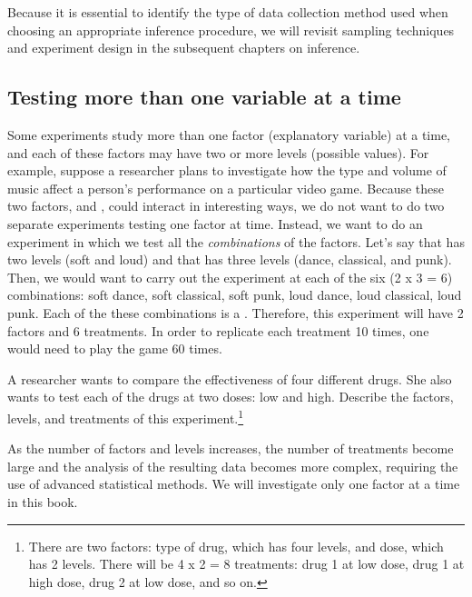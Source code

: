 Because it is essential to identify the type of data collection method used when choosing an appropriate inference procedure, we will revisit sampling techniques and experiment design in the subsequent chapters on inference.



\subsection{Testing more than one variable at a time}


Some experiments study more than one factor (explanatory variable) at a time, and each of these factors may have two or more levels (possible values). For example, suppose a researcher plans to investigate how the type and volume of music affect a person's performance on a particular video game. Because these two factors,  and , could interact in interesting ways, we do not want to do two separate experiments testing one factor at time. %
Instead, we want to do an experiment in which
we test all the \emph{combinations} of the factors. Let's say that  has two levels (soft and loud) and that  has three levels (dance, classical, and punk). Then, we would want to carry out the experiment at each of the six (2 x 3 = 6) combinations: soft dance, soft classical, soft punk, loud dance, loud classical, loud punk. Each of the these combinations is a . Therefore, this experiment will have 2 factors and 6 treatments. In order to replicate each treatment 10 times, one would need to play the game 60 times.

\begin{exercise}A researcher wants to compare the effectiveness of four different drugs. She also wants to test each of the drugs at two doses: low and high. Describe the factors, levels, and treatments of this experiment.\footnote{There are two factors: type of drug, which has four levels, and dose, which has 2 levels. There will be 4 x 2 = 8 treatments: drug 1 at low dose, drug 1 at high dose, drug 2 at low dose, and so on.}
\end{exercise}

As the number of factors and levels increases, the number of treatments become large and the analysis of the resulting data becomes more complex, requiring the use of advanced statistical methods. We will investigate only one factor at a time in this book.

